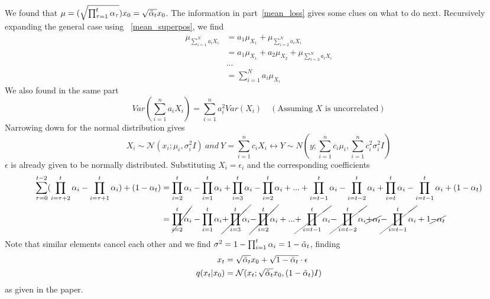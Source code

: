 \documentclass{article}
\numberwithin{equation}{subsection}
\begin{document}
We found that $\mu = (\sqrt{\prod_{\tau=1}^{t}\alpha_\tau})x_0 = \sqrt{\Tilde{\alpha}_t}x_0$. The information in part~\ref{mean_loss} gives some clues on what to do next. Recursively expanding the general case using ~\ref{mean_superpos}, we find
\begin{align}
    \mu_{\sum_{i=1}^N a_i X_i} &= a_1\mu_{X_1} + \mu_{\sum_{i=2}^N a_i X_i}\\
    &= a_1\mu_{X_1} + a_2\mu_{X_2} + \mu_{\sum_{i=3}^N a_i X_i}\\
    & ...\\
    &= \sum_{i=1}^N a_i \mu_{X_i}
    \label{meansum}
\end{align}
We also found in the same part
\begin{equation}
    Var(\sum_{i=1}^{n} a_i X_i) = \sum_{i=1}^{n} a_i^2 Var(X_i) \quad (\text{Assuming $X$ is uncorrelated})
    \label{varsum}
\end{equation}
Narrowing down for the normal distribution gives
\begin{equation}
    X_i \sim \mathcal{N}(x_i; \mu_i, \sigma_i^2 I)\ and\ Y = \sum_{i=1}^{n}c_iX_i \longleftrightarrow Y \sim N(y; \sum_{i=1}^{n}c_i\mu_i,\sum_{i=1}^{n}c_i^2\sigma_i^2 I)
\end{equation}
$\epsilon$ is already given to be normally distributed. Substituting $X_i = \epsilon_i$ and the corresponding coefficients 
\begin{align}
    \sum_{\tau=0}^{t-2}(\prod_{i=\tau+2}^{t}\alpha_i-\prod_{i=\tau+1}^{t}\alpha_i)+(1-\alpha_t) &= \prod_{i=2}^{t}\alpha_i-\prod_{i=1}^{t}\alpha_i+\prod_{i=3}^{t}\alpha_i-\prod_{i=2}^{t}\alpha_i+...+\prod_{i=t-1}^{t}\alpha_i-\prod_{i=t-2}^{t}\alpha_i+\prod_{i=t}^{t}\alpha_i-\prod_{i=t-1}^{t}\alpha_i+(1-\alpha_t)\\
    &= \cancel{\prod_{i=2}^{t}\alpha_i}-\prod_{i=1}^{t}\alpha_i\cancel{+\prod_{i=3}^{t}\alpha_i}\cancel{-\prod_{i=2}^{t}\alpha_i}+...\cancel{+\prod_{i=t-1}^{t}\alpha_i}\cancel{-\prod_{i=t-2}^{t}\alpha_i}\cancel{+\alpha_t}\cancel{-\prod_{i=t-1}^{t}\alpha_i}+1\cancel{-\alpha_t}
\end{align}
Note that similar elements cancel each other and we find $\sigma^2 = 1-\prod_{i=1}^{t}\alpha_i = 1 - \Tilde{\alpha}_t$, finding 
\begin{align}
    x_t &= \sqrt{\Tilde{\alpha}_t}x_0 + \sqrt{1 - \Tilde{\alpha}_t} \cdot \epsilon\\
    q(x_t|x_0) &= \mathcal{N}(x_t;\sqrt{\Tilde{\alpha}_t}x_0,(1 - \Tilde{\alpha}_t)I)
\end{align}
as given in the paper.
\end{document}
